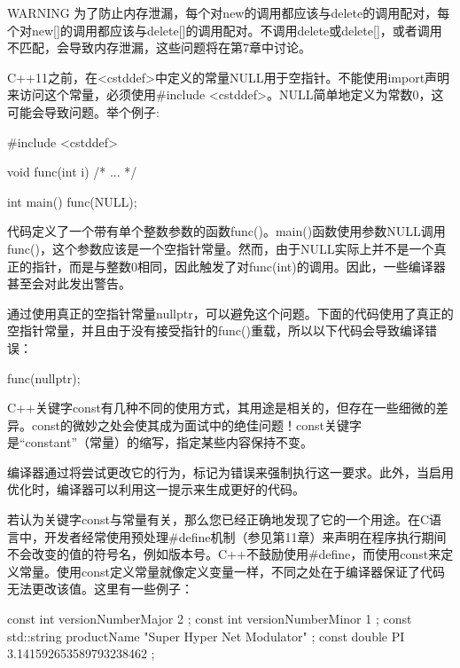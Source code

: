 \begin{myWarning}{WARNING}
为了防止内存泄漏，每个对new的调用都应该与delete的调用配对，每个对new[]的调用都应该与delete[]的调用配对。不调用delete或delete[]，或者调用不匹配，会导致内存泄漏，这些问题将在第7章中讨论。
\end{myWarning}


C++11之前，在<cstddef>中定义的常量NULL用于空指针。不能使用import声明来访问这个常量，必须使用\#include <cstddef>。NULL简单地定义为常数0，这可能会导致问题。举个例子:

\begin{cpp}
#include <cstddef>

void func(int i) { /* ... */ }

int main()
{
    func(NULL);
}
\end{cpp}

代码定义了一个带有单个整数参数的函数func()。main()函数使用参数NULL调用func()，这个参数应该是一个空指针常量。然而，由于NULL实际上并不是一个真正的指针，而是与整数0相同，因此触发了对func(int)的调用。因此，一些编译器甚至会对此发出警告。

通过使用真正的空指针常量nullptr，可以避免这个问题。下面的代码使用了真正的空指针常量，并且由于没有接受指针的func()重载，所以以下代码会导致编译错误：

\begin{cpp}
func(nullptr);
\end{cpp}


C++关键字const有几种不同的使用方式，其用途是相关的，但存在一些细微的差异。const的微妙之处会使其成为面试中的绝佳问题！const关键字是“constant”（常量）的缩写，指定某些内容保持不变。

编译器通过将尝试更改它的行为，标记为错误来强制执行这一要求。此外，当启用优化时，编译器可以利用这一提示来生成更好的代码。


若认为关键字const与常量有关，那么您已经正确地发现了它的一个用途。在C语言中，开发者经常使用预处理\#define机制（参见第11章）来声明在程序执行期间不会改变的值的符号名，例如版本号。C++不鼓励使用\#define，而使用const来定义常量。使用const定义常量就像定义变量一样，不同之处在于编译器保证了代码无法更改该值。这里有一些例子：

\begin{cpp}
const int versionNumberMajor { 2 };
const int versionNumberMinor { 1 };
const std::string productName { "Super Hyper Net Modulator" };
const double PI { 3.141592653589793238462 };
\end{cpp}

